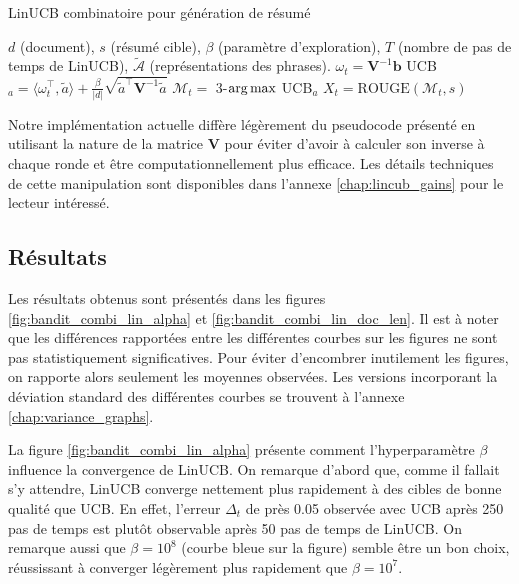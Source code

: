 \begin{algorithm}
    \caption{LinUCB combinatoire pour génération de résumé}
    \begin{algorithmic}[1]
        \Require $d$ (document), $s$ (résumé cible), $\beta$ (paramètre d'exploration), $T$ (nombre de pas de temps de LinUCB), $\tilde{\mathcal{A}}$ (représentations des phrases).
        \State $\omega_t = \mathbf{V}^{-1}\mathbf{b}$
        \State UCB$_a = \langle \omega_t^\top, \tilde{a} \rangle + \frac{\beta}{|d|}\sqrt{\tilde{a}^\top \mathbf{V}^{-1} \tilde{a}}$
        \EndFor
        \State $\mathcal{M}_t =$ 3-$\operatorname*{arg\,max}$ UCB$_a$
        \State $X_t = \text{ROUGE}(\mathcal{M}_t, s)$
        \EndFor
        \EndFor
    \end{algorithmic}
    \label{alg:cible_linucb}
\end{algorithm}


Notre implémentation actuelle diffère légèrement du pseudocode présenté 
en utilisant la nature de la matrice $\mathbf{V}$ pour éviter d'avoir 
à calculer son inverse à chaque ronde et être computationnellement plus efficace.
Les détails techniques de cette manipulation sont disponibles dans l'annexe 
\ref{chap:lincub_gains} pour le lecteur intéressé.

\subsection{Résultats}

Les résultats obtenus sont présentés dans les figures 
\ref{fig:bandit_combi_lin_alpha} et \ref{fig:bandit_combi_lin_doc_len}.
Il est à noter que les différences rapportées entre les différentes 
courbes sur les figures ne sont pas statistiquement significatives.
Pour éviter d'encombrer inutilement les figures, on rapporte alors 
seulement les moyennes observées.
Les versions incorporant la déviation standard des différentes courbes 
se trouvent à l'annexe \ref{chap:variance_graphs}.

La figure \ref{fig:bandit_combi_lin_alpha} présente comment l'hyperparamètre $\beta$ influence la
convergence de LinUCB.
On remarque d'abord que, comme il fallait s'y attendre, LinUCB converge
nettement plus rapidement à des cibles de bonne qualité que UCB.
En effet, l'erreur $\Delta_t$ de près 0.05 observée avec UCB après 250 pas de temps est plutôt 
observable après 50 pas de temps de LinUCB.
On remarque aussi que $\beta=10^8$ (courbe bleue sur la figure) semble être un bon choix,
réussissant à converger légèrement plus rapidement que $\beta=10^7$.

